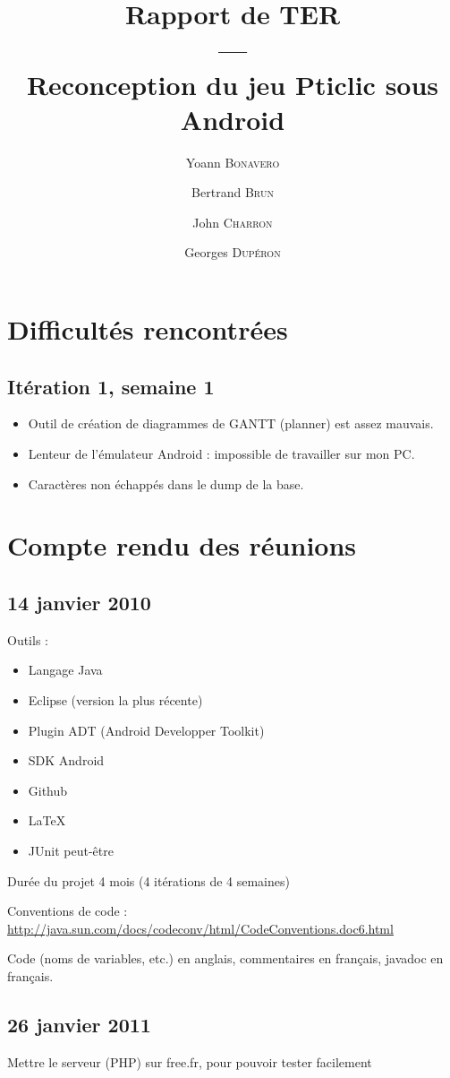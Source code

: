 \documentclass[a4paper,11pt,french]{article}
\title{Rapport de TER\\---\\Reconception du jeu Pticlic sous Android}
\author{Yoann \textsc{Bonavero} \and Bertrand \textsc{Brun} \and John \textsc{Charron} \and Georges \textsc{Dupéron}}
\begin{document}
\maketitle

\tableofcontents
\newpage

\section{Difficultés rencontrées}
\subsection{Itération 1, semaine 1}
\begin{itemize}
\item Outil de création de diagrammes de GANTT (planner) est assez mauvais.
\item Lenteur de l'émulateur Android : impossible de travailler sur mon PC.%
\item Caractères non échappés dans le dump de la base.%
\end{itemize}

\section{Compte rendu des réunions}
\subsection{14 janvier 2010}
Outils :
\begin{itemize}
\item Langage Java
\item Eclipse (version la plus récente)
\item Plugin ADT (Android Developper Toolkit)
\item SDK Android
\item Github
\item LaTeX
\item JUnit peut-être
\end{itemize}

Durée du projet 4 mois (4 itérations de 4 semaines)

Conventions de code : \url{http://java.sun.com/docs/codeconv/html/CodeConventions.doc6.html}

Code (noms de variables, etc.) en anglais, commentaires en français, javadoc en français.

\subsection{26 janvier 2011}
Mettre le serveur (PHP) sur free.fr, pour pouvoir tester facilement
\end{document}
